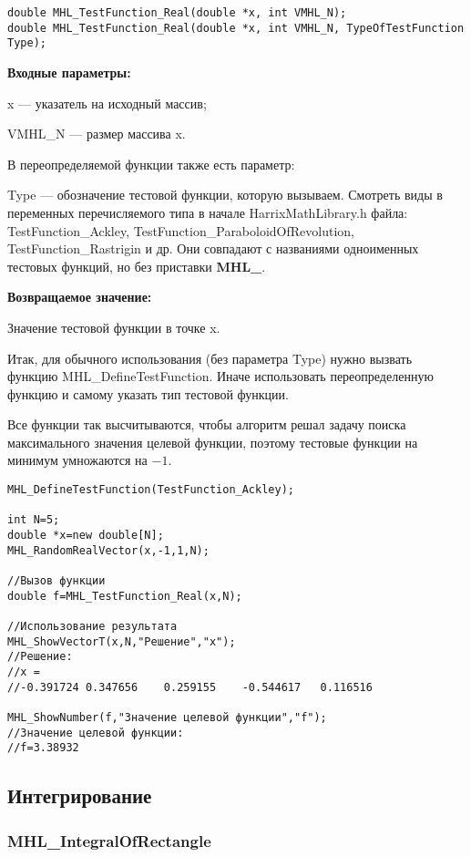 \documentclass[a4paper,12pt]{article}
\begin{document}
\begin{lstlisting}[label=code_syntax_MHL_TestFunction_Real,caption=Синтаксис]
double MHL_TestFunction_Real(double *x, int VMHL_N);
double MHL_TestFunction_Real(double *x, int VMHL_N, TypeOfTestFunction Type);
\end{lstlisting}

\textbf{Входные параметры:}

x --- указатель на исходный массив;

VMHL\_N --- размер массива x.

В переопределяемой функции также есть параметр:
  
Type --- обозначение тестовой функции, которую вызываем.
Смотреть виды в переменных перечисляемого типа в начале HarrixMathLibrary.h файла: TestFunction\_Ackley, TestFunction\_ParaboloidOfRevolution, TestFunction\_Rastrigin и др. Они совпадают с названиями одноименных тестовых функций, но без приставки \textbf{MHL\_}.

\textbf{Возвращаемое значение:}
 
Значение тестовой функции в точке x.

Итак, для обычного использования (без параметра Type) нужно вызвать функцию MHL\_DefineTestFunction. Иначе использовать переопределенную функцию и самому указать тип тестовой функции.

Все функции так высчитываются, чтобы алгоритм решал задачу поиска максимального значения целевой функции, поэтому тестовые функции на минимум умножаются на $-1$.


\begin{lstlisting}[label=code_use_MHL_TestFunction_Real,caption=Пример использования]
MHL_DefineTestFunction(TestFunction_Ackley);

int N=5;
double *x=new double[N];
MHL_RandomRealVector(x,-1,1,N);

//Вызов функции
double f=MHL_TestFunction_Real(x,N);

//Использование результата
MHL_ShowVectorT(x,N,"Решение","x");
//Решение:
//x =
//-0.391724	0.347656	0.259155	-0.544617	0.116516

MHL_ShowNumber(f,"Значение целевой функции","f");
//Значение целевой функции:
//f=3.38932
\end{lstlisting}

\subsection{Интегрирование}

\subsubsection{MHL\_IntegralOfRectangle}\label{MHL_IntegralOfRectangle}
\end{document}
